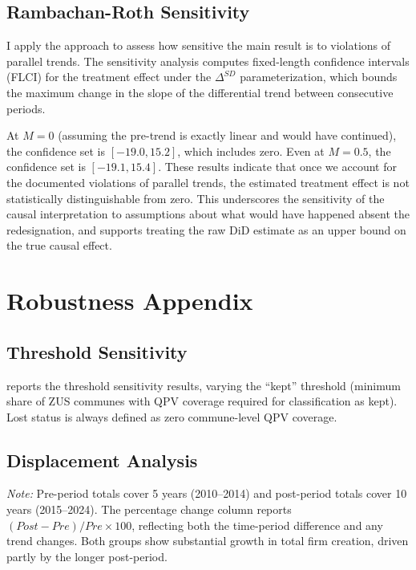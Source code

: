 \documentclass[12pt]{article}
\begin{document}
\subsection{Rambachan-Roth Sensitivity}

I apply the \citet{rambachan2023more} approach to assess how sensitive the main result is to violations of parallel trends. The sensitivity analysis computes fixed-length confidence intervals (FLCI) for the treatment effect under the $\Delta^{SD}$ parameterization, which bounds the maximum change in the slope of the differential trend between consecutive periods.

At $M = 0$ (assuming the pre-trend is exactly linear and would have continued), the confidence set is $[-19.0, 15.2]$, which includes zero. Even at $M = 0.5$, the confidence set is $[-19.1, 15.4]$. These results indicate that once we account for the documented violations of parallel trends, the estimated treatment effect is not statistically distinguishable from zero. This underscores the sensitivity of the causal interpretation to assumptions about what would have happened absent the redesignation, and supports treating the raw DiD estimate as an upper bound on the true causal effect.


\section{Robustness Appendix}

\subsection{Threshold Sensitivity}

 reports the threshold sensitivity results, varying the ``kept'' threshold (minimum share of ZUS communes with QPV coverage required for classification as kept). Lost status is always defined as zero commune-level QPV coverage.



\subsection{Displacement Analysis}

\textit{Note:} Pre-period totals cover 5 years (2010--2014) and post-period totals cover 10 years (2015--2024). The percentage change column reports $(Post - Pre) / Pre \times 100$, reflecting both the time-period difference and any trend changes. Both groups show substantial growth in total firm creation, driven partly by the longer post-period.
\end{document}
